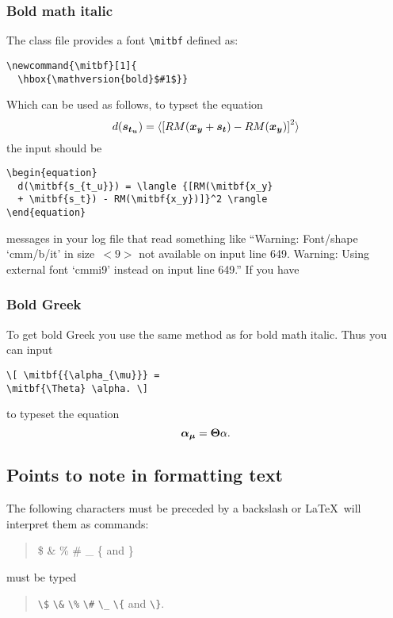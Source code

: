 \subsubsection{Bold math italic}\label{boldmathitalic}

The class file provides a font \verb"\mitbf" defined as:
\begin{verbatim}
\newcommand{\mitbf}[1]{
  \hbox{\mathversion{bold}$#1$}}
\end{verbatim}
Which can be used as follows, to typset the equation
\begin{equation}
  d(\mitbf{s_{t_u}}) = \langle {[RM(\mitbf{x_y} + \mitbf{s_t}) - RM(\mitbf{x_y})]}^2 \rangle
\end{equation}
the input should be
\begin{verbatim}
\begin{equation}
  d(\mitbf{s_{t_u}}) = \langle {[RM(\mitbf{x_y}
  + \mitbf{s_t}) - RM(\mitbf{x_y})]}^2 \rangle
\end{equation}
\end{verbatim}

messages in your log file that read something like ``Warning: Font/shape
`cmm/b/it' in size~\hbox{$< \!\! 9 \!\! >$} not available on input line 649.
Warning: Using external font `cmmi9' instead on input line 649.'' If you have


\subsubsection{Bold Greek}\label{boldgreek}

To get bold Greek you use the same method as for bold math italic. Thus you can
input
\begin{verbatim}
\[ \mitbf{{\alpha_{\mu}}} =
\mitbf{\Theta} \alpha. \]
\end{verbatim}
to typeset the equation \[ \mitbf{{\alpha_{\mu}}} = \mitbf{\Theta} \alpha. \]


\subsection{Points to note in formatting text}\label{formtext}

The following characters must be preceded by a backslash or \LaTeX\ will
interpret them as commands:
\begin{quote}
\$ \& \% \# \_ \{ and \}
\end{quote}
must be typed
\begin{center}
\begin{quote}
\verb"\$" \verb"\&" \verb"\%" \verb"\#" \verb"\_" \verb"\{" and \verb"\}".
\end{quote}
\end{center}

